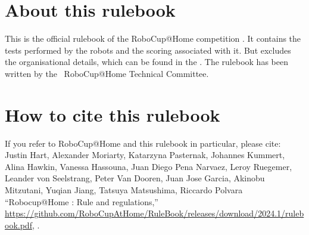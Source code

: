 
\section*{About this rulebook}
This is the official rulebook of the RoboCup@Home competition \YEAR. It contains the tests performed by the robots and the scoring associated with it. But excludes the organisational details, which can be found in the \Organisation.
The rulebook has been written by the \YEAR ~RoboCup@Home Technical Committee.

\section*{How to cite this rulebook}
If you refer to RoboCup@Home and this rulebook in particular, please cite:\\

\noindent Justin Hart, Alexander Moriarty, Katarzyna Pasternak, Johannes Kummert,
Alina Hawkin, Vanessa Hassouna, Juan Diego Pena Narvaez, Leroy Ruegemer,
Leander von Seelstrang, Peter Van Dooren, Juan Jose Garcia, Akinobu Mitzutani,
Yuqian Jiang, Tatsuya Matsushima, Riccardo Polvara
\enquote{Robocup@Home \YEAR: Rule and regulations,}
\url{https://github.com/RoboCupAtHome/RuleBook/releases/download/2024.1/rulebook.pdf}, \YEAR.

\begin{center}
	\begin{minipage}{0.8\textwidth}
		\footnotesize%
		
	\end{minipage}
\end{center}

\pagebreak